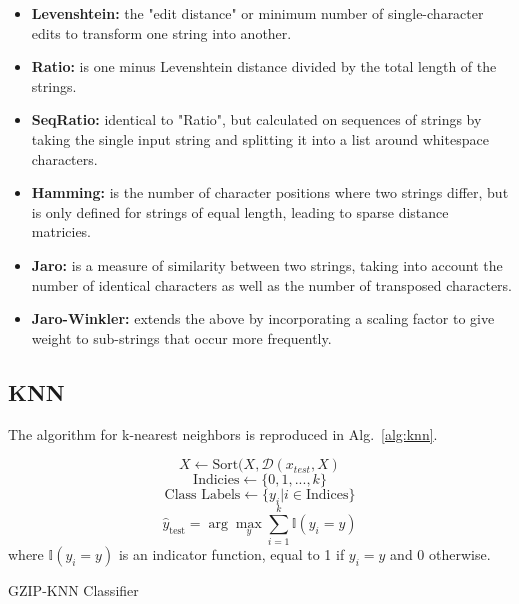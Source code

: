 \documentclass[sigconf]{acmart}
\begin{document}
\begin{itemize}
    \item \textbf{Levenshtein:} the "edit distance" or minimum number of single-character edits to transform one string into another.
    \item \textbf{Ratio:} is one minus Levenshtein distance divided by the total length of the strings.
    \item \textbf{SeqRatio:} identical to "Ratio", but calculated on sequences of strings by taking the single input string and splitting it into a list around whitespace characters.
    \item \textbf{Hamming:} is the number of character positions where two strings differ, but is only defined for strings of equal length, leading to sparse distance matricies.
    \item \textbf{Jaro:} is a measure of similarity between two strings, taking into account the number of identical characters as well as the number of transposed characters.
    \item \textbf{Jaro-Winkler:} extends the above by incorporating a scaling factor to give weight to sub-strings that occur more frequently. 
\end{itemize}


\subsection{KNN}
The algorithm for k-nearest neighbors is reproduced in Alg.~\ref{alg:knn}.

\begin{algorithm}
    
    \[
    X \leftarrow \textrm{Sort}(X, \mathcal{D}(x_{test}, X)
    \]
    \[
    \textrm{Indicies} \leftarrow \{ 0, 1, ..., k \}
    \]
    \[
    \textrm{Class~Labels} \leftarrow \{y_i | i \in \textrm{Indices} \}
    \]
    \[
    \hat{y}_{\text{test}} = \arg\max_y \sum_{i=1}^{k} \mathbb{I}(y_i = y)
    \]
    where $\mathbb{I}(y_i = y)$ is an indicator function, equal to 1 if $y_i = y$ and 0 otherwise.
    \caption{GZIP-KNN Classifier}
    \label{alg:knn}
\end{algorithm}
\end{document}
